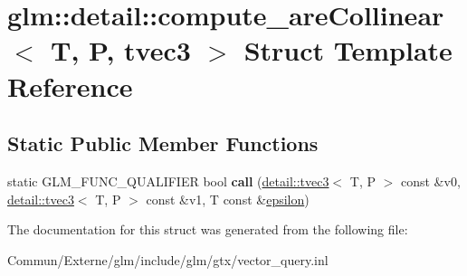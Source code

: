 \hypertarget{structglm_1_1detail_1_1compute__are_collinear_3_01_t_00_01_p_00_01tvec3_01_4}{}\section{glm\+:\+:detail\+:\+:compute\+\_\+are\+Collinear$<$ T, P, tvec3 $>$ Struct Template Reference}
\label{structglm_1_1detail_1_1compute__are_collinear_3_01_t_00_01_p_00_01tvec3_01_4}
\subsection*{Static Public Member Functions}
\begin{DoxyCompactItemize}
\item 
static G\+L\+M\+\_\+\+F\+U\+N\+C\+\_\+\+Q\+U\+A\+L\+I\+F\+I\+ER bool {\bfseries call} (\hyperlink{structglm_1_1detail_1_1tvec3}{detail\+::tvec3}$<$ T, P $>$ const \&v0, \hyperlink{structglm_1_1detail_1_1tvec3}{detail\+::tvec3}$<$ T, P $>$ const \&v1, T const \&\hyperlink{group__gtc__constants_gacb41049b8d22c8aa90e362b96c524feb}{epsilon})\hypertarget{structglm_1_1detail_1_1compute__are_collinear_3_01_t_00_01_p_00_01tvec3_01_4_a1b9e023b1518128243ec6cc5748faccc}{}\label{structglm_1_1detail_1_1compute__are_collinear_3_01_t_00_01_p_00_01tvec3_01_4_a1b9e023b1518128243ec6cc5748faccc}

\end{DoxyCompactItemize}


The documentation for this struct was generated from the following file\+:\begin{DoxyCompactItemize}
\item 
Commun/\+Externe/glm/include/glm/gtx/vector\+\_\+query.\+inl\end{DoxyCompactItemize}
